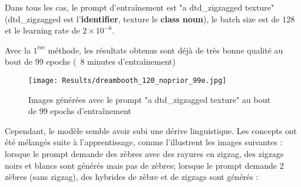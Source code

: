 \documentclass{article}
\begin{document}
Dans tous les cas, le prompt d'entraînement est "a dtd\_zigzagged texture" (dtd\_zigzagged est l'\textbf{identifier}, texture le \textbf{class noun}), le batch size est de 128 et le learning rate de $2 \times 10^{-6}$. \par
Avec la $1^{\text{ère}}$ méthode, les résultats obtenus sont déjà de très bonne qualité au bout de 99 epochs (~8 minutes d'entraînement)
\vspace{-0.5cm}
\begin{figure}[H]
    \centering
    \texttt{[image: Results/dreambooth\_120\_noprior\_99e.jpg]}
    \caption{Images générées avec le prompt "a dtd\_zigzagged texture" au bout de 99 epochs d'entraînement}
\end{figure}
\vspace{-0.5cm}
Cependant, le modèle semble avoir subi une dérive linguistique. Les concepts ont été mélangés suite à l'apprentissage, comme l'illustrent les images suivantes : lorsque le prompt demande des zèbres avec des rayures en zigzag, des zigzags noirs et blancs sont générés mais pas de zèbres; lorsque le prompt demande 2 zèbres (sans zigzag), des hybrides de zèbre et de zigzags sont générés :
\end{document}
